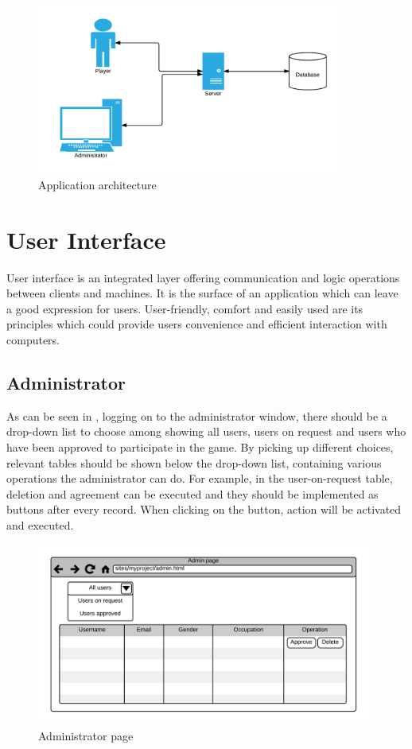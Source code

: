 \begin{figure}[!htb]
  \centering
  \includegraphics[width=10cm]{model.png}
  \caption{Application architecture}
  \label{Figure:fig33}
\end{figure}

\section{User Interface}
User interface is an integrated layer offering communication and logic operations between clients and machines. It is the surface of an application which can leave a good expression for users. User-friendly, comfort and easily used are its principles which could provide users convenience and efficient interaction with computers.



\subsection{Administrator}
As can be seen in , logging on to the administrator window, there should be a drop-down list to choose among showing all users, users on request and users who have been approved to participate in the game. By picking up different choices, relevant tables should be shown below the drop-down list, containing various operations the administrator can do. For example, in the user-on-request table, deletion and agreement can be executed and they should be implemented as buttons after every record. When clicking on the button, action will be activated and executed.
\begin{figure}[!htb]
  \centering
  \includegraphics[width=11cm]{admin_page.png}
  \caption{Administrator page}
  \label{Figure:fig35}
\end{figure}

